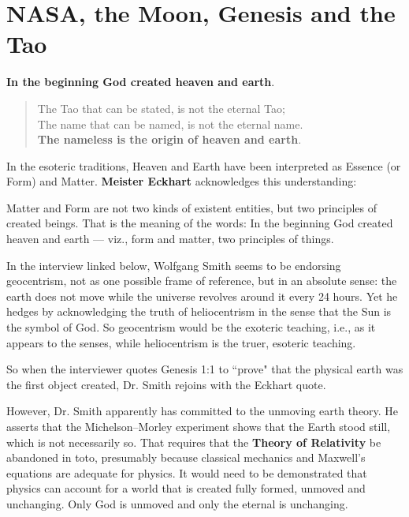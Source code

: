 \section{NASA, the Moon, Genesis and the Tao}

\begin{quotex}
\textbf{In the beginning God created heaven and earth}. 

\begin{verse}
The Tao that can be stated, is not the eternal Tao;\\
The name that can be named, is not the eternal name.\\
\textbf{The nameless is the origin of heaven and earth}.
\end{verse} 

\end{quotex}
In the esoteric traditions, Heaven and Earth have been interpreted as Essence (or Form) and Matter. \textbf{Meister Eckhart} acknowledges this understanding:

\begin{quotex}
Matter and Form are not two kinds of existent entities, but two principles of created beings. That is the meaning of the words: In the beginning God created heaven and earth — viz., form and matter, two principles of things. 

\end{quotex}
In the interview linked below, Wolfgang Smith seems to be endorsing geocentrism, not as one possible frame of reference, but in an absolute sense: the earth does not move while the universe revolves around it every 24 hours. Yet he hedges by acknowledging the truth of heliocentrism in the sense that the Sun is the symbol of God. So geocentrism would be the exoteric teaching, i.e., as it appears to the senses, while heliocentrism is the truer, esoteric teaching.

So when the interviewer quotes Genesis 1:1 to ``prove" that the physical earth was the first object created, Dr. Smith rejoins with the Eckhart quote.

However, Dr. Smith apparently has committed to the unmoving earth theory. He asserts that the Michelson–Morley experiment shows that the Earth stood still, which is not necessarily so. That requires that the \textbf{Theory of Relativity} be abandoned in toto, presumably because classical mechanics and Maxwell's equations are adequate for physics. It would need to be demonstrated that physics can account for a world that is created fully formed, unmoved and unchanging. Only God is unmoved and only the eternal is unchanging.

